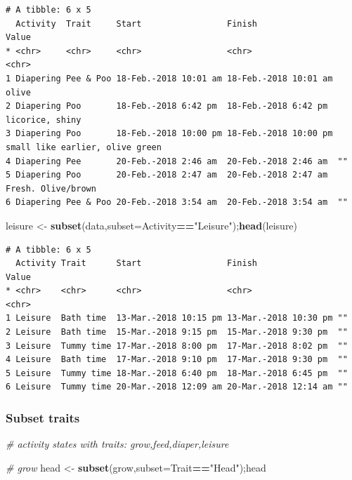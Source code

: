 \documentclass[10,portrait]{article}
\newenvironment{Shaded}{\begin{snugshade}}{\end{snugshade}}
\newcommand{\KeywordTok}[1]{\textcolor[rgb]{0.13,0.29,0.53}{\textbf{#1}}}
\newcommand{\DataTypeTok}[1]{\textcolor[rgb]{0.13,0.29,0.53}{#1}}
\newcommand{\StringTok}[1]{\textcolor[rgb]{0.31,0.60,0.02}{#1}}
\newcommand{\CommentTok}[1]{\textcolor[rgb]{0.56,0.35,0.01}{\textit{#1}}}
\newcommand{\OperatorTok}[1]{\textcolor[rgb]{0.81,0.36,0.00}{\textbf{#1}}}
\newcommand{\NormalTok}[1]{#1}
\begin{document}
\begin{verbatim}
# A tibble: 6 x 5
  Activity  Trait     Start                 Finish                Value                          
* <chr>     <chr>     <chr>                 <chr>                 <chr>                          
1 Diapering Pee & Poo 18-Feb.-2018 10:01 am 18-Feb.-2018 10:01 am olive                          
2 Diapering Poo       18-Feb.-2018 6:42 pm  18-Feb.-2018 6:42 pm  licorice, shiny                
3 Diapering Poo       18-Feb.-2018 10:00 pm 18-Feb.-2018 10:00 pm small like earlier, olive green
4 Diapering Pee       20-Feb.-2018 2:46 am  20-Feb.-2018 2:46 am  ""                             
5 Diapering Poo       20-Feb.-2018 2:47 am  20-Feb.-2018 2:47 am  Fresh. Olive/brown             
6 Diapering Pee & Poo 20-Feb.-2018 3:54 am  20-Feb.-2018 3:54 am  ""                             
\end{verbatim}

\begin{Shaded}
\begin{Highlighting}[]
\NormalTok{leisure <-}\StringTok{ }\KeywordTok{subset}\NormalTok{(data,}\DataTypeTok{subset=}\NormalTok{Activity}\OperatorTok{==}\StringTok{"Leisure"}\NormalTok{);}\KeywordTok{head}\NormalTok{(leisure)}
\end{Highlighting}
\end{Shaded}

\begin{verbatim}
# A tibble: 6 x 5
  Activity Trait      Start                 Finish                Value
* <chr>    <chr>      <chr>                 <chr>                 <chr>
1 Leisure  Bath time  13-Mar.-2018 10:15 pm 13-Mar.-2018 10:30 pm ""   
2 Leisure  Bath time  15-Mar.-2018 9:15 pm  15-Mar.-2018 9:30 pm  ""   
3 Leisure  Tummy time 17-Mar.-2018 8:00 pm  17-Mar.-2018 8:02 pm  ""   
4 Leisure  Bath time  17-Mar.-2018 9:10 pm  17-Mar.-2018 9:30 pm  ""   
5 Leisure  Tummy time 18-Mar.-2018 6:40 pm  18-Mar.-2018 6:45 pm  ""   
6 Leisure  Tummy time 20-Mar.-2018 12:09 am 20-Mar.-2018 12:14 am ""   
\end{verbatim}

\subsubsection{Subset traits}\label{subset-traits}

\begin{Shaded}
\begin{Highlighting}[]
\CommentTok{# activity states with traits: grow,feed,diaper,leisure}

\CommentTok{# grow}
\NormalTok{head <-}\StringTok{ }\KeywordTok{subset}\NormalTok{(grow,}\DataTypeTok{subset=}\NormalTok{Trait}\OperatorTok{==}\StringTok{"Head"}\NormalTok{);head}
\end{Highlighting}
\end{Shaded}
\end{document}
